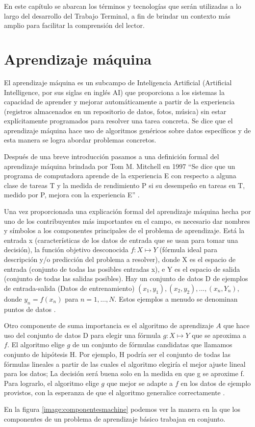 En este capítulo se abarcan los términos y tecnologías que serán utilizadas a lo largo del desarrollo del Trabajo Terminal, a fin de brindar un contexto más amplio para facilitar la comprensión del lector.
\section{Aprendizaje máquina}
El aprendizaje máquina es un subcampo de Inteligencia Artificial (Artificial Intelligence, por sus siglas en inglés AI) que proporciona a los sistemas la capacidad de aprender y mejorar automáticamente a partir de la experiencia (registros almacenados en un repositorio de datos, fotos, música) sin estar explícitamente programados para resolver una tarea concreta. Se dice que el aprendizaje máquina hace uso de algoritmos genéricos sobre datos específicos y de esta manera se logra abordar problemas concretos.   
\\ \par 
Después de una breve introducción pasamos a una definición formal del aprendizaje máquina brindada por Tom M. Mitchell en 1997  ``Se dice que un programa de computadora aprende de la experiencia E con respecto a alguna clase de tareas T y la medida de rendimiento P si su desempeño en tareas en T, medido por P, mejora con la experiencia E'' \cite{mitchell}.
\\ \par
Una vez proporcionada una explicación formal del aprendizaje máquina hecha por uno de los contribuyentes más importantes en el campo, es necesario dar nombres y símbolos a los componentes principales de el problema de aprendizaje. Está la entrada x (características de los datos de entrada que se usan para tomar una decisión), la función objetivo desconocida $f: X \mapsto Y$ (fórmula ideal para descripción y/o predicción del problema a resolver), donde X es el espacio de entrada (conjunto de todas las posibles entradas x), e Y es el espacio de salida (conjunto de todas las salidas posibles). Hay un conjunto de datos D de ejemplos de entrada-salida (Datos de entrenamiento) $(x_1, y_1),(x_2,y_2), ... , (x_n, Y_n)$, donde $y_n = f(x_n)$ para $n = 1, ... , N$. Estos ejemplos a menudo se denominan puntos de datos \cite{Mostafa}. 
\\ \par
Otro componente de suma importancia es el algoritmo de aprendizaje $A$ que hace uso del conjunto de datos D para elegir una fórmula $g: X \mapsto Y$ que se aproxima a $f$. El algoritmo elige $g$ de un conjunto de fórmulas candidatas que llamamos conjunto de hipótesis H. 
Por ejemplo, H podría ser el conjunto de todas las fórmulas lineales a partir de las cuales el algoritmo elegiría el mejor ajuste lineal para los datos; La decisión será buena solo en la medida en que g se aproxime f. Para lograrlo, el algoritmo elige $g$ que mejor se adapte a $f$ en los datos de ejemplo provistos, con la esperanza de que el algoritmo generalice correctamente \cite{Mostafa}.
\\ \par
En la figura \ref{image:componentesmachine} podemos ver la manera en la que  los componentes de un problema de aprendizaje básico trabajan en conjunto.

